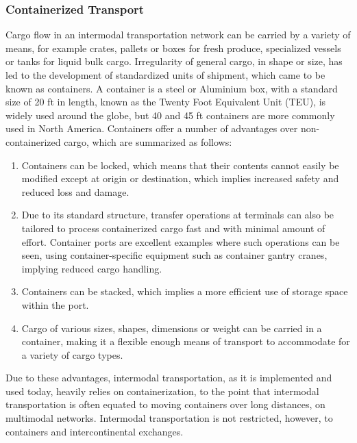 \subsubsection{Containerized Transport}
Cargo flow in an intermodal transportation network can be carried by a variety of means, for example crates, pallets or boxes for fresh produce, specialized vessels or tanks for liquid bulk cargo. Irregularity of general cargo, in shape or size, has led to the development of standardized units of shipment, which came to be known as containers. A container is a steel or Aluminium box, with a standard size of 20 ft in length, known as the Twenty Foot Equivalent Unit (TEU), is widely used around the globe, but 40 and 45 ft containers are more commonly used in North America. Containers offer a number of advantages over non-containerized cargo, which are summarized as follows:
\begin{enumerate}
	\item Containers can be locked, which means that their contents cannot easily be modified except at origin or destination, which implies increased safety and reduced loss and damage.
	\item Due to its standard structure, transfer operations at terminals can also be tailored to process containerized cargo fast and with minimal amount of effort. Container ports are excellent examples where such operations can be seen, using container-specific equipment such as container gantry cranes, implying reduced cargo handling.
	\item Containers can be stacked, which implies a more efficient use of storage space within the port.
	\item Cargo of various sizes, shapes, dimensions or weight can be carried in a container, making it a flexible enough means of transport to accommodate for a variety of cargo types.
\end{enumerate}
Due to these advantages, intermodal transportation, as it is implemented and used today, heavily relies on containerization, to the point that intermodal transportation is often equated to moving containers over long distances, on multimodal networks. Intermodal transportation is not restricted, however, to containers and intercontinental exchanges.
%
